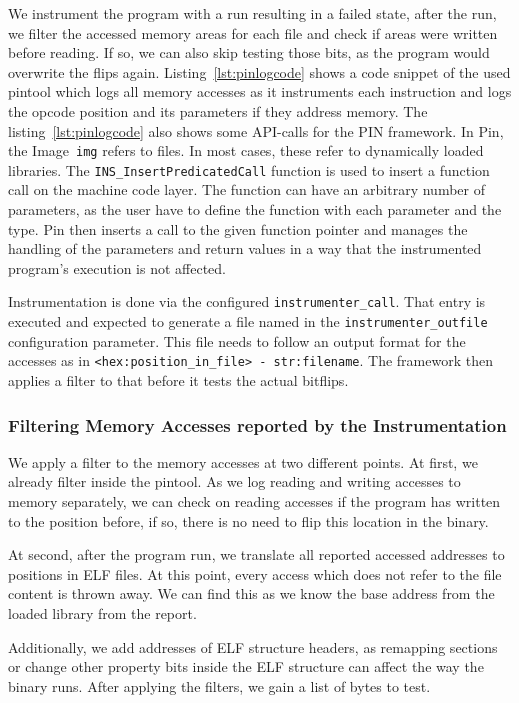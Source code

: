 We instrument the program with a run resulting in a failed state, after the run,
we filter the accessed memory areas for each file and check if areas were
written before reading. If so, we can also skip testing those bits, as the
program would overwrite the flips again. Listing~\ref{lst:pinlogcode} shows a
code snippet of the used pintool which logs all memory accesses as it
instruments each instruction and logs the opcode position and its parameters if
they address memory. The listing~\ref{lst:pinlogcode} also shows some API-calls
for the PIN framework. In Pin, the Image~\texttt{img} refers to files. In most
cases, these refer to dynamically loaded libraries. The
\texttt{INS\_InsertPredicatedCall} function is used to insert a function call on
the machine code layer. The function can have an arbitrary number of parameters,
as the user have to define the function with each parameter and the type. Pin
then inserts a call to the given function pointer and manages the handling of
the parameters and return values in a way that the instrumented program's
execution is not affected.

Instrumentation is done via the configured \texttt{instrumenter\_call}. That
entry is executed and expected to generate a file named in the
\texttt{instrumenter\_outfile} configuration parameter. This file needs to
follow an output format for the accesses as in \texttt{<hex:position\_in\_file>
- str:filename}. The framework then applies a filter to that before it tests the
actual bitflips.

\subsubsection{Filtering Memory Accesses reported by the Instrumentation}

We apply a filter to the memory accesses at two different points. At first, we
already filter inside the pintool. As we log reading and writing accesses to
memory separately, we can check on reading accesses if the program
has written to the position before, if so, there is no need to flip this
location in the binary.

At second, after the program run, we translate all reported accessed addresses
to positions in ELF files. At this point, every access which does not refer to
the file content is thrown away. We can find this as we know the base address
from the loaded library from the report.

Additionally, we add addresses of ELF structure headers, as remapping sections
or change other property bits inside the ELF structure can affect the way the
binary runs. After applying the filters, we gain a list of bytes to test.

